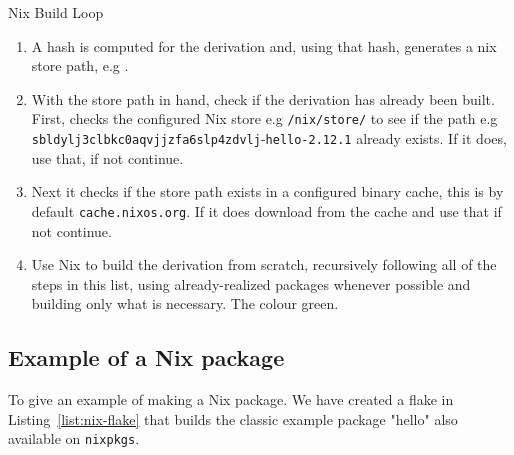 \begin{figureBox}[label = {fig:nix-derivation-loop}, width=0.8\linewidth]{Nix Build Loop}
  { \footnotesize
  \begin{enumerate}
    \item A hash is computed for the derivation and, using that hash, generates a nix store path, e.g .
    \item  With the store path in hand, check if the derivation has already been built. First, checks the configured Nix store e.g {\color{Purple}\texttt{/nix/store/}} to see if the path e.g {\color{RoyalBlue}\texttt{sbldylj3clbkc0aqvjjzfa6slp4zdvlj}}-{\color{Orange}\texttt{hello-2.12.1}} already exists. If it does, use that, if not continue.
    \item Next it checks if the store path exists in a configured binary cache, this is by default \texttt{cache.nixos.org}. If it does download from the cache and use that if not continue.
    \item Use Nix to build the derivation from scratch, recursively following all of the steps in this list, using already-realized packages whenever possible and building only what is necessary. The colour green. 
  \end{enumerate}
  }
\end{figureBox}

\subsection{Example of a Nix package}

To give an example of making a Nix package. We have created a flake in Listing~\ref{list:nix-flake} that builds the classic example package "hello"  also available on \texttt{nixpkgs}. \\




